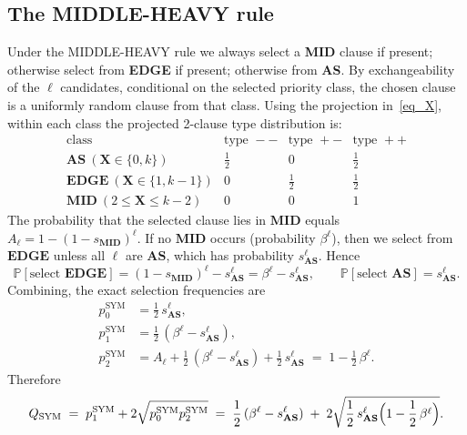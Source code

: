\documentclass[11pt,reqno]{amsart}
\numberwithin{equation}{section}
\renewcommand{\vec}[1]{\boldsymbol{#1}}
\newcommand\vX{\vec X}
\newcommand\pr{\mathbb{P}}
\renewcommand\Pr{\pr}
\def\pr{{\mathbb P}}
\begin{document}
	\subsection{The MIDDLE-HEAVY rule}
	Under the MIDDLE-HEAVY rule we always select a \textbf{MID} clause if present; otherwise select from \textbf{EDGE} if present; otherwise from \textbf{AS}. 
	By exchangeability of the \(\ell\) candidates, conditional on the selected priority class, the chosen clause is a uniformly random clause from that class. 
	Using the projection in~\eqref{eq_X}, within each class the projected 2-clause type distribution is:
	\[
	\begin{array}{c|ccc}
		\text{class} & \text{type }-- & \text{type }+- & \text{type }++\\\hline
		\mathbf{AS}\ (\vX\in\{0,k\}) & \tfrac12 & 0 & \tfrac12\\
		\mathbf{EDGE}\ (\vX\in\{1,k-1\}) & 0 & \tfrac12 & \tfrac12\\
		\mathbf{MID}\ (2\le \vX\le k-2) & 0 & 0 & 1
	\end{array}
	\]
	The probability that the selected clause lies in \(\mathbf{MID}\) equals \(A_\ell=1-(1-s_{\mathbf{MID}})^\ell\).
	If no \(\mathbf{MID}\) occurs (probability \(\beta^\ell\)), then we select from \(\mathbf{EDGE}\) unless all \(\ell\) are \(\mathbf{AS}\), which has probability \(s_{\mathbf{AS}}^\ell\). Hence
	\[
	\Pr[\text{select }\mathbf{EDGE}]=(1-s_{\mathbf{MID}})^\ell - s_{\mathbf{AS}}^\ell=\beta^\ell - s_{\mathbf{AS}}^\ell,\qquad
	\Pr[\text{select }\mathbf{AS}]=s_{\mathbf{AS}}^\ell.
	\]
	Combining, the exact selection frequencies are
	\begin{equation}\label{eq:p012-sym}
			\begin{aligned}
				p_0^{\mathrm{SYM}} &= \frac12\,s_{\mathbf{AS}}^\ell,\\[2pt]
				p_1^{\mathrm{SYM}} &= \frac12\,(\beta^\ell - s_{\mathbf{AS}}^\ell),\\[2pt]
				p_2^{\mathrm{SYM}} &= A_\ell + \frac12\,(\beta^\ell - s_{\mathbf{AS}}^\ell) + \frac12\,s_{\mathbf{AS}}^\ell
				\;=\;1-\frac12\,\beta^\ell.
			\end{aligned}
	\end{equation}
	Therefore
	\begin{equation}\label{eq:Q-sym}
		Q_{\mathrm{SYM}} \;=\; p_1^{\mathrm{SYM}} + 2\sqrt{p_0^{\mathrm{SYM}}p_2^{\mathrm{SYM}}}
		\;=\;\frac12\,(\beta^\ell - s_{\mathbf{AS}}^\ell)\;+\;2\sqrt{\frac12\,s_{\mathbf{AS}}^\ell\Bigl(1-\frac12\,\beta^\ell\Bigr)}.
	\end{equation}
\end{document}
